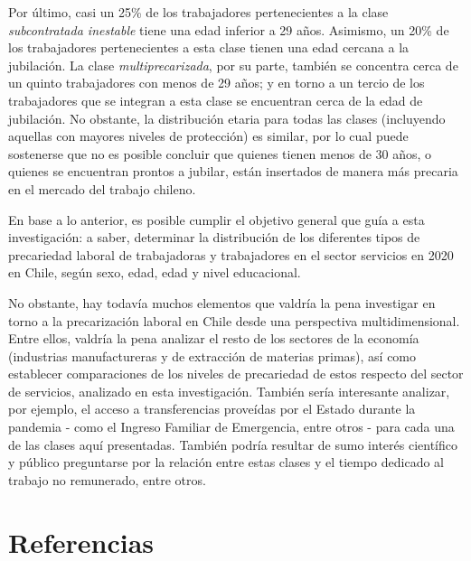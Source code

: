 \documentclass[
]{article}
\begin{document}
Por último, casi un 25\% de los trabajadores pertenecientes a la clase
\emph{subcontratada inestable} tiene una edad inferior a 29 años.
Asimismo, un 20\% de los trabajadores pertenecientes a esta clase tienen
una edad cercana a la jubilación. La clase \emph{multiprecarizada}, por
su parte, también se concentra cerca de un quinto trabajadores con menos
de 29 años; y en torno a un tercio de los trabajadores que se integran a
esta clase se encuentran cerca de la edad de jubilación. No obstante, la
distribución etaria para todas las clases (incluyendo aquellas con
mayores niveles de protección) es similar, por lo cual puede sostenerse
que no es posible concluir que quienes tienen menos de 30 años, o
quienes se encuentran prontos a jubilar, están insertados de manera más
precaria en el mercado del trabajo chileno.

En base a lo anterior, es posible cumplir el objetivo general que guía a
esta investigación: a saber, determinar la distribución de los
diferentes tipos de precariedad laboral de trabajadoras y trabajadores
en el sector servicios en 2020 en Chile, según sexo, edad, edad y nivel
educacional.

No obstante, hay todavía muchos elementos que valdría la pena investigar
en torno a la precarización laboral en Chile desde una perspectiva
multidimensional. Entre ellos, valdría la pena analizar el resto de los
sectores de la economía (industrias manufactureras y de extracción de
materias primas), así como establecer comparaciones de los niveles de
precariedad de estos respecto del sector de servicios, analizado en esta
investigación. También sería interesante analizar, por ejemplo, el
acceso a transferencias proveídas por el Estado durante la pandemia -
como el Ingreso Familiar de Emergencia, entre otros - para cada una de
las clases aquí presentadas. También podría resultar de sumo interés
científico y público preguntarse por la relación entre estas clases y el
tiempo dedicado al trabajo no remunerado, entre otros.

\hypertarget{referencias}{%
\section*{Referencias}\label{referencias}}
\end{document}
